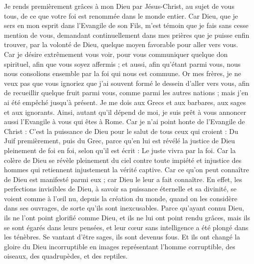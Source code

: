 \begin{multicols}{2}
Je rends premièrement grâces à mon Dieu par Jésus-Christ, au sujet de vous tous, de ce que votre foi est renommée dans le monde entier.
Car Dieu, que je sers en mon esprit dans l'Evangile de son Fils, m'est témoin que je fais sans cesse mention de vous,
demandant continuellement dans mes prières que je puisse enfin trouver, par la volonté de Dieu, quelque moyen favorable pour aller vers vous.
Car je désire extrêmement vous voir, pour vous communiquer quelque don spirituel, afin que vous soyez affermis ;
et aussi, afin qu'étant parmi vous, nous nous consolions ensemble par la foi qui nous est commune.
Or mes frères, je ne veux pas que vous ignoriez que j’ai souvent formé le dessein d'aller vers vous, afin de recueillir quelque fruit parmi vous, comme parmi les autres nations ; mais j'en ai été empêché jusqu'à présent.
Je me dois aux Grecs et aux barbares, aux sages et aux ignorants.
Ainsi, autant qu’il dépend de moi, je suis prêt à vous annoncer aussi l'Evangile à vous qui êtes à Rome.
Car je n'ai point honte de l'Evangile de Christ : C’est la puissance de Dieu pour le salut de tous ceux qui croient : Du Juif premièrement, puis du Grec,
parce qu’en lui est révélé la justice de Dieu pleinement de foi en foi, selon qu'il est écrit : Le juste vivra par la foi.
Car la colère de Dieu se révèle pleinement du ciel contre toute impiété et injustice des hommes qui retiennent injustement la vérité captive.
Car ce qu’on peut connaître de Dieu est manifesté parmi eux ; car Dieu le leur a fait connaître.
En effet, les perfections invisibles de Dieu, à savoir sa puissance éternelle et sa divinité, se voient comme à l’œil nu, depuis la création du monde, quand on les considère dans ses ouvrages, de sorte qu'ils sont inexcusables.
Parce qu'ayant connu Dieu, ils ne l'ont point glorifié comme Dieu, et ils ne lui ont point rendu grâces, mais ils se sont égarés dans leurs pensées, et leur cœur sans intelligence a été plongé dans les ténèbres.
Se vantant d’être sages, ils sont devenus fous.
Et ils ont changé la gloire du Dieu incorruptible en images représentant l'homme corruptible, des oiseaux, des quadrupèdes, et des reptiles.

\end{multicols}
